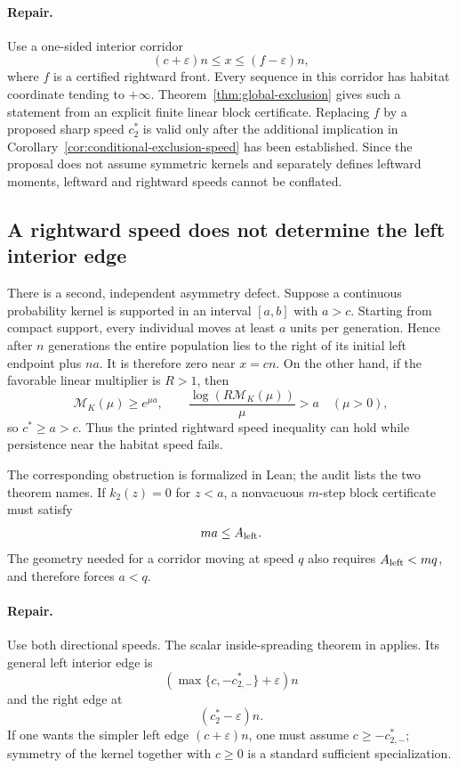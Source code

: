 \documentclass[11pt]{article}
\theoremstyle{definition}
\newcommand{\M}{\mathcal M}
\begin{document}
\paragraph{Repair.}
Use a one-sided interior corridor
\[
  (c+\varepsilon)n
  \leq x
  \leq(f-\varepsilon)n,
\]
where \(f\) is a certified rightward front.
Every sequence in this corridor has habitat coordinate tending to
\(+\infty\).  Theorem~\ref{thm:global-exclusion} gives such a statement from
an explicit finite linear block certificate.  Replacing \(f\) by a proposed
sharp speed \(c_2^*\) is valid only after the additional implication in
Corollary~\ref{cor:conditional-exclusion-speed} has been established.  Since
the proposal does not assume symmetric kernels and separately defines
leftward moments, leftward and rightward speeds cannot be conflated.

\subsection{A rightward speed does not determine the left interior edge}

There is a second, independent asymmetry defect.  Suppose a continuous
probability kernel is supported in an interval \([a,b]\) with \(a>c\).
Starting from compact support, every individual moves at least \(a\) units
per generation.  Hence after \(n\) generations the entire population lies
to the right of its initial left endpoint plus \(na\).  It is therefore zero
near \(x=cn\).  On the other hand, if the favorable linear multiplier is
\(R>1\), then
\[
  \M_K(\mu)\geq e^{\mu a},
  \qquad
  \frac{\log(R\M_K(\mu))}{\mu}>a
  \quad(\mu>0),
\]
so \(c^*\geq a>c\).  Thus the printed rightward speed inequality can hold
while persistence near the habitat speed fails.

The corresponding obstruction is formalized in Lean; the audit lists the
two theorem names.  If \(k_2(z)=0\) for \(z<a\), a nonvacuous \(m\)-step
block certificate must satisfy
\[
  ma\leq A_{\rm left}.
\]
The geometry needed for a corridor moving at speed \(q\) also requires
\(A_{\rm left}<mq\), and therefore forces \(a<q\).

\paragraph{Repair.}
Use both directional speeds.  The scalar inside-spreading theorem in
\cite{LiBewickBarnardFagan2016} applies.  Its general left interior edge is
\[
  \left(\max\{c,-c_{2,-}^*\}+\varepsilon\right)n
\]
and the right edge at
\[
  (c_2^*-\varepsilon)n.
\]
If one wants the simpler left edge \((c+\varepsilon)n\), one must assume
\(c\geq-c_{2,-}^*\); symmetry of the kernel together with \(c\geq0\) is a
standard sufficient specialization.
\end{document}
